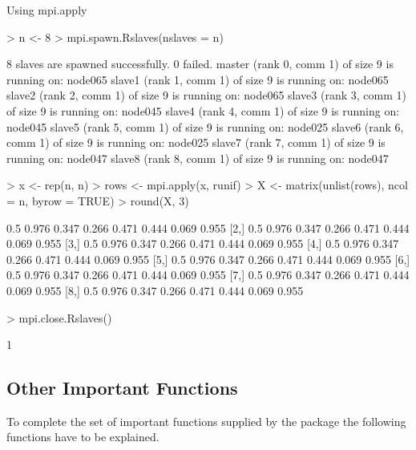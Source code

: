 \begin{Example} Using mpi.apply
\label{ex:Rmpi3}
\begin{Schunk}
\begin{Sinput}
> n <- 8
> mpi.spawn.Rslaves(nslaves = n)
\end{Sinput}
\begin{Soutput}
	8 slaves are spawned successfully. 0 failed.
master (rank 0, comm 1) of size 9 is running on: node065 
slave1 (rank 1, comm 1) of size 9 is running on: node065 
slave2 (rank 2, comm 1) of size 9 is running on: node065 
slave3 (rank 3, comm 1) of size 9 is running on: node045 
slave4 (rank 4, comm 1) of size 9 is running on: node045 
slave5 (rank 5, comm 1) of size 9 is running on: node025 
slave6 (rank 6, comm 1) of size 9 is running on: node025 
slave7 (rank 7, comm 1) of size 9 is running on: node047 
slave8 (rank 8, comm 1) of size 9 is running on: node047 
\end{Soutput}
\begin{Sinput}
> x <- rep(n, n)
> rows <- mpi.apply(x, runif)
> X <- matrix(unlist(rows), ncol = n, byrow = TRUE)
> round(X, 3)
\end{Sinput}
\begin{Soutput}
     [,1]  [,2]  [,3]  [,4]  [,5]  [,6]  [,7]  [,8]
[1,]  0.5 0.976 0.347 0.266 0.471 0.444 0.069 0.955
[2,]  0.5 0.976 0.347 0.266 0.471 0.444 0.069 0.955
[3,]  0.5 0.976 0.347 0.266 0.471 0.444 0.069 0.955
[4,]  0.5 0.976 0.347 0.266 0.471 0.444 0.069 0.955
[5,]  0.5 0.976 0.347 0.266 0.471 0.444 0.069 0.955
[6,]  0.5 0.976 0.347 0.266 0.471 0.444 0.069 0.955
[7,]  0.5 0.976 0.347 0.266 0.471 0.444 0.069 0.955
[8,]  0.5 0.976 0.347 0.266 0.471 0.444 0.069 0.955
\end{Soutput}
\begin{Sinput}
> mpi.close.Rslaves()
\end{Sinput}
\begin{Soutput}
[1] 1
\end{Soutput}
\end{Schunk}
\end{Example}

\subsection{Other Important Functions}

To complete the set of important functions supplied by the 
package the following functions have to be explained.

